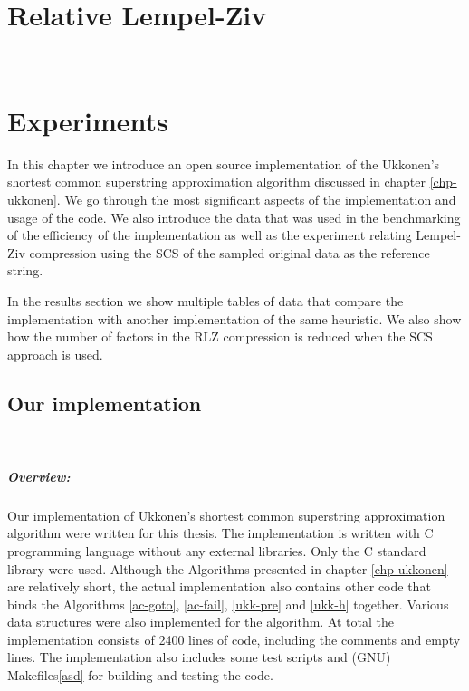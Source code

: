 \documentclass[english,twoside,censored,csm,algorithms-track-2020]{HYthesisML}
\theoremstyle{plain}
\theoremstyle{definition}
\begin{document}

\chapter{Relative Lempel-Ziv}~\label{chp-rlz}



\chapter{Experiments}

In this chapter we introduce an open source implementation of the Ukkonen's shortest common superstring
approximation algorithm discussed in chapter \ref{chp-ukkonen}. We go through the most significant
aspects of the implementation and usage of the code. We also introduce the data that was used in the
benchmarking of the efficiency of the implementation as well as the experiment relating
Lempel-Ziv compression using the SCS of the sampled original data as the reference string.

In the results section we show multiple tables of data that compare the implementation with
another implementation of the same heuristic. We also show how the number of factors in the
RLZ compression is reduced when the SCS approach is used.

\section{Our implementation}~\label{sec-our}

\paragraph{Overview:}
Our implementation of Ukkonen's shortest common superstring approximation algorithm were written
for this thesis. The implementation is written with C programming language without any external
libraries. Only the C standard library were used. Although the Algorithms presented in chapter
\ref{chp-ukkonen} are relatively short, the actual implementation also contains other code
that binds the Algorithms \ref{ac-goto}, \ref{ac-fail}, \ref{ukk-pre} and \ref{ukk-h} together. 
Various data structures were also implemented for the algorithm. At total the implementation consists
of 2400 lines of code, including the comments and empty lines. The implementation also includes some
test scripts and (GNU) Makefiles\ref{asd} for building and testing the code. 
\end{document}
